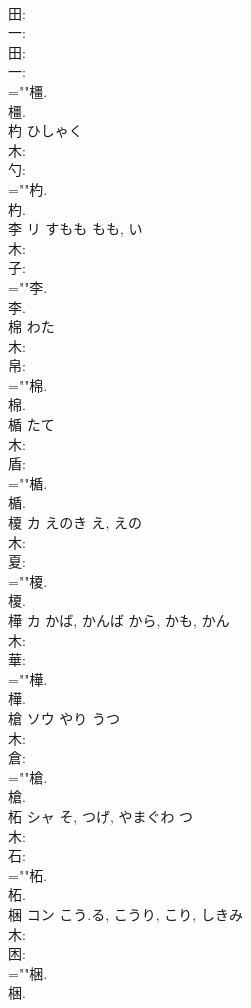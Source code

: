 \documentclass[8pt]{extreport}
\begin{document}
\begin{CJK}{UTF8}{min}
\\	田: 
\\	一: 
\\	田: 
\\	一: 
\\	=""橿.
\\	橿.
\\	杓		ひしゃく				
\\	木: 
\\	勺: 
\\	=""杓.
\\	杓.
\\	李	リ	すもも	もも, い	
\\	木: 
\\	子: 
\\	=""李.
\\	李.
\\	棉		わた				
\\	木: 
\\	帛: 
\\	=""棉.
\\	棉.
\\	楯		たて				
\\	木: 
\\	盾: 
\\	=""楯.
\\	楯.
\\	榎	カ	えのき	え, えの	
\\	木: 
\\	夏: 
\\	=""榎.
\\	榎.
\\	樺	カ	かば, かんば	から, かも, かん	
\\	木: 
\\	華: 
\\	=""樺.
\\	樺.
\\	槍	ソウ	やり	うつ	
\\	木: 
\\	倉: 
\\	=""槍.
\\	槍.
\\	柘	シャ	そ, つげ, やまぐわ	つ	
\\	木: 
\\	石: 
\\	=""柘.
\\	柘.
\\	梱	コン	こう.る, こうり, こり, しきみ		
\\	木: 
\\	困: 
\\	=""梱.
\\	梱.

\end{CJK}
\end{document}
